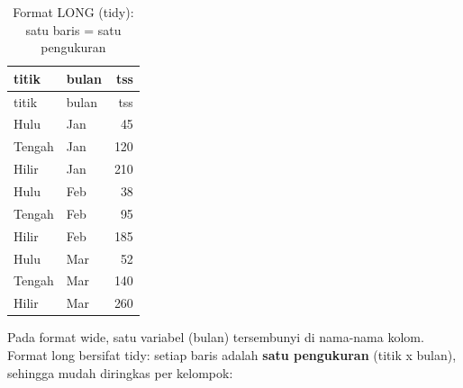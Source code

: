 \documentclass[
  indonesian,
  letterpaper,
]{book}
\newenvironment{Shaded}{\begin{snugshade}}{\end{snugshade}}
\newcommand{\AttributeTok}[1]{\textcolor[rgb]{0.40,0.45,0.13}{#1}}
\newcommand{\ConstantTok}[1]{\textcolor[rgb]{0.56,0.35,0.01}{#1}}
\newcommand{\FunctionTok}[1]{\textcolor[rgb]{0.28,0.35,0.67}{#1}}
\newcommand{\NormalTok}[1]{\textcolor[rgb]{0.00,0.23,0.31}{#1}}
\newcommand{\OtherTok}[1]{\textcolor[rgb]{0.00,0.23,0.31}{#1}}
\newcommand{\SpecialCharTok}[1]{\textcolor[rgb]{0.37,0.37,0.37}{#1}}
\newcommand{\StringTok}[1]{\textcolor[rgb]{0.13,0.47,0.30}{#1}}
\begin{document}
\begin{Shaded}
\end{Shaded}

\begin{longtable}[]{@{}llr@{}}
\caption{Format LONG (tidy): satu baris = satu
pengukuran}\tabularnewline
\toprule\noalign{}
titik & bulan & tss \\
\midrule\noalign{}
\endfirsthead
\toprule\noalign{}
titik & bulan & tss \\
\midrule\noalign{}
\endhead
\bottomrule\noalign{}
\endlastfoot
Hulu & Jan & 45 \\
Tengah & Jan & 120 \\
Hilir & Jan & 210 \\
Hulu & Feb & 38 \\
Tengah & Feb & 95 \\
Hilir & Feb & 185 \\
Hulu & Mar & 52 \\
Tengah & Mar & 140 \\
Hilir & Mar & 260 \\
\end{longtable}

Pada format wide, satu variabel (bulan) tersembunyi di nama-nama kolom.
Format long bersifat tidy: setiap baris adalah \textbf{satu pengukuran}
(titik x bulan), sehingga mudah diringkas per kelompok:
\end{document}
